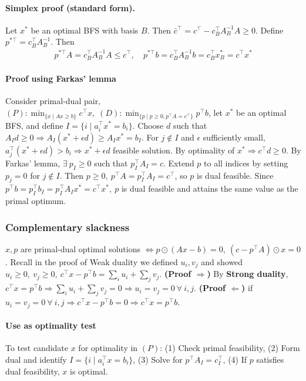 \documentclass{article}
\begin{document}
\paragraph{Simplex proof (standard form).}
Let $x^*$ be an optimal BFS with basis $B$. Then $\bar c^\top = c^\top - c_B^\top A_B^{-1}A \ge 0$.  
Define $p^{*\top} = c_B^\top A_B^{-1}$. Then
\begin{align*}
p^{*\top} A = c_B^\top A_B^{-1}A \le c^\top,\quad
p^{*\top} b = c_B^\top A_B^{-1}b = c_B^\top x_B^* = c^\top x^*
\tag{So $p^*$ dual feasible and optimal, with equal cost}
\end{align*}

\paragraph{Proof using Farkas' lemma} Consider primal-dual pair, $(P):\min_{\{x\mid Ax\geq b\}}c^\top x,\; (D): \min_{\{p\mid p\geq 0, p^\top A=c^\top\}}p^\top b$, let $x^*$ be an optimal BFS, and define $I = \{i\mid a_i^\top x^* = b_i\}$. Choose $d$ such that $A_Id \geq 0 \Longrightarrow A_I (x^* + \epsilon d)\geq A_Ix^* = b_I$. For $j \notin I$ and $\epsilon$ sufficiently small, $a_j^\top (x^* + \epsilon d) > b_i \Longrightarrow x^* + \epsilon d$ feasible solution. By optimality of $x^*\Longrightarrow c^\top d \geq 0$. 
By Farkas' lemma, $\exists\ p_I\geq 0$ such that $p_I^\top A_I = c$. Extend $p$ to all indices by setting $p_j = 0$ for $j\notin I$. Then $p \ge 0,\ p^\top A = p_I^\top A_I = c^\top$, so $p$ is dual feasible. Since $p^\top b = p_I^\top b_I = p_I^\top A_I x^* = c^\top x^*,\ p$ is dual feasible and attains the same value as the primal optimum.

\subsubsection{Complementary slackness}
$x,p$ are primal-dual optimal solutions $\iff p \odot (A x - b) = 0,\ (c - p^\top A) \odot x = 0$. Recall in the proof of Weak duality we defined $u_i, v_j$ and showed $u_i \geq 0,\ v_j \geq 0,\ c^\top x-p^\top b = \sum_iu_i + \sum_jv_j$. \textbf{(Proof $\Rightarrow$)} By \textbf{Strong duality}, $c^\top x = p^\top b \Longrightarrow \sum_iu_i + \sum_jv_j = 0 \Longrightarrow u_i = v_j = 0\ \forall\ i,j$. \textbf{(Proof $\Leftarrow$)} if $u_i = v_j = 0\ \forall\ i,j \Longrightarrow c^\top x - p^\top b = 0 \Longrightarrow c^\top x = p^\top b$. 

\paragraph{Use as optimality test} To test candidate $x$ for optimality in $(P)$: (1) Check primal feasibility, (2) Form dual and identify $I=\{i\mid a_i^\top x=b_i\}$, (3) Solve for $p^\top A_I = c^\top_I$, (4) If $p$ satisfies dual feasibility, $x$ is optimal.  
\end{document}
